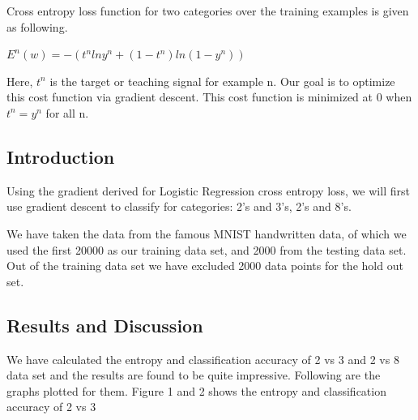 \documentclass{article} %
\begin{document}
Cross entropy loss function for two categories over the training examples is given as following.\\

\begin{center}
$E^n(w) = -(t^n lny^n + (1-t^n) ln(1-y^n))$\\
\hfill\break
\end{center}

Here, $t^n$ is the target or teaching signal for example n. Our goal is to optimize this cost function via gradient descent. This cost function is minimized at 0 when $t^n = y^n$ for all n.
\subsection{Introduction}
Using the gradient derived for Logistic Regression cross entropy loss, we will first use gradient descent to classify for categories: 2's and 3's, 2's and 8's.  

We have taken the data from the famous MNIST handwritten data, of which we used the first 20000 as our training data set, and 2000 from the testing data set. Out of the training data set we have excluded 2000 data points for the hold out set.\\

\subsection{Results and Discussion}
We have calculated the entropy and classification accuracy of 2 vs 3 and 2 vs 8 data set and the results are found to be quite impressive. Following are the graphs plotted for them. Figure 1 and 2 shows the entropy and classification accuracy of 2 vs 3
\end{document}
